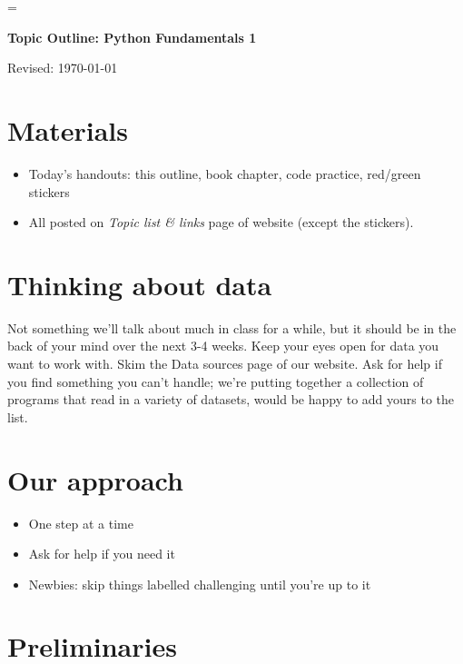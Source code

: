 \documentclass[11pt]{article}
\begin{document}
\parskip=\bigskipamount
\parindent=0.0in
\thispagestyle{empty}


\bigskip\bigskip
\centerline{\Large \bf Topic Outline:  Python Fundamentals 1}
\centerline{Revised: \today}


\section*{Materials}

\begin{itemize}
\item  Today's handouts:  this outline, book chapter, code practice, red/green stickers
\item  All posted on {\it Topic list \& links\/} page of website (except the stickers).
\end{itemize}


\section*{Thinking about data}

Not something we'll talk about much in class for a while, but it should be in the back of
your mind over the next 3-4 weeks.  Keep your eyes open for data you want to work with.
Skim the Data sources page of our website.
Ask for help if you find something you can't handle; we're putting together
a collection of programs that read in a variety of datasets, would be happy to add yours
to the list.


\section*{Our approach}

\begin{itemize}
\item One step at a time
\item Ask for help if you need it
\item Newbies:  skip things labelled challenging until you're up to it
\end{itemize}


\section*{Preliminaries}
\end{document}
